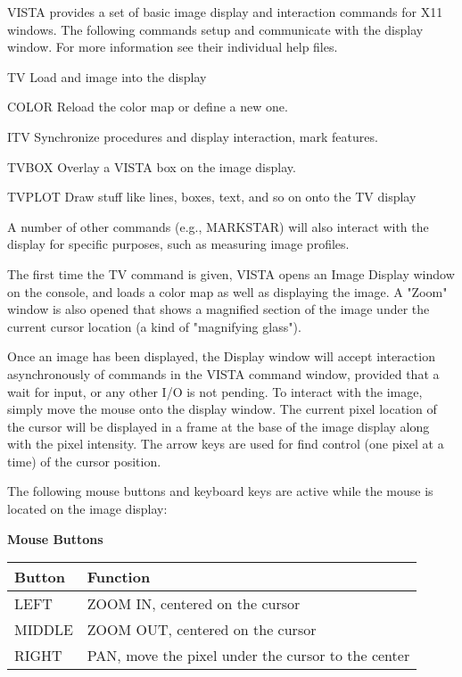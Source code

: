 VISTA provides a set of basic image display and interaction commands for
X11 windows.  The following commands setup and communicate with the display
window.  For more information see their individual help files.
\begin{example} 
  \item[TV\hfill]{Load and image into the display}
  \item[COLOR\hfill]{Reload the color map or define a new one.}
  \item[ITV\hfill]{Synchronize procedures and display interaction, mark
       features.}
  \item[TVBOX\hfill]{Overlay a VISTA box on the image display.}
  \item[TVPLOT \hfill]{Draw stuff like lines, boxes, text, and so on onto the 
       TV display}
\end{example} 
A number of other commands (e.g., MARKSTAR) will also interact with the
display for specific purposes, such as measuring image profiles.

The first time the TV command is given, VISTA opens an Image Display
window on the console, and loads a color map as well as displaying the
image. A "Zoom" window is also opened that shows a magnified section of
the image under the current cursor location (a kind of "magnifying
glass").
 
Once an image has been displayed, the Display window will accept
interaction asynchronously of commands in the VISTA command window,
provided that a wait for input, or any other I/O is not pending.  To
interact with the image, simply move the mouse onto the display window.
The current pixel location of the cursor will be displayed in a frame at
the base of the image display along with the pixel intensity.  The arrow
keys are used for find control (one pixel at a time) of the cursor
position.
 
The following mouse buttons and keyboard keys are active while the mouse
is located on the image display:
 
\begin{center}
{\bf Mouse Buttons}\\
\begin{tabular}{ll}
\hline
Button & Function\\
\hline
LEFT  &ZOOM IN, centered on the cursor\\
MIDDLE&ZOOM OUT, centered on the cursor\\
RIGHT &PAN, move the pixel under the cursor to the center\\
\hline
\end{tabular}
\end{center}
 
